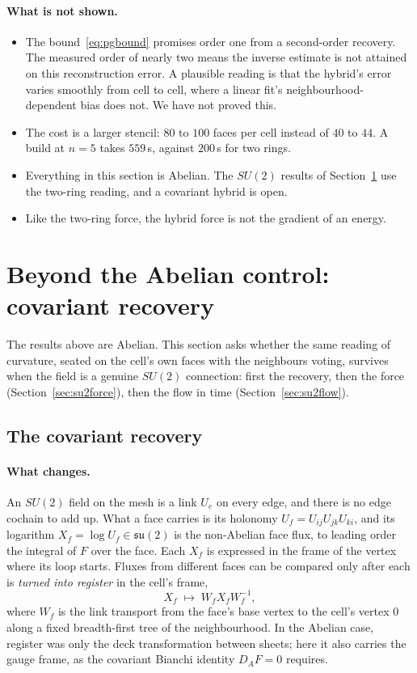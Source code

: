 \documentclass[11pt]{article}
\theoremstyle{definition}
\theoremstyle{remark}
\begin{document}
\paragraph{What is not shown.}
\begin{itemize}
  \item The bound~\eqref{eq:pgbound} promises order one from a second-order recovery. The
    measured order of nearly two means the inverse estimate is not attained on this
    reconstruction error. A plausible reading is that the hybrid's error varies smoothly from
    cell to cell, where a linear fit's neighbourhood-dependent bias does not. We have not
    proved this.
  \item The cost is a larger stencil: $80$ to $100$ faces per cell instead of $40$ to $44$.
    A build at $n=5$ takes $559$\,s, against $200$\,s for two rings.
  \item Everything in this section is Abelian. The $SU(2)$ results of
    Section~\ref{sec:su2} use the two-ring reading, and a covariant hybrid is open.
  \item Like the two-ring force, the hybrid force is not the gradient of an energy.
\end{itemize}

\section{Beyond the Abelian control: covariant recovery}\label{sec:su2}

The results above are Abelian. This section asks whether the same reading of curvature,
seated on the cell's own faces with the neighbours voting, survives when the field is a
genuine $SU(2)$ connection: first the recovery, then the force
(Section~\ref{sec:su2force}), then the flow in time (Section~\ref{sec:su2flow}).

\subsection{The covariant recovery}\label{sec:su2rec}

\paragraph{What changes.} An $SU(2)$ field on the mesh is a link $U_e$ on every edge, and
there is no edge cochain to add up. What a face carries is its holonomy
$U_f=U_{ij}U_{jk}U_{ki}$, and its logarithm $X_f=\log U_f\in\mathfrak{su}(2)$ is the
non-Abelian face flux, to leading order the integral of $F$ over the face. Each $X_f$ is
expressed in the frame of the vertex where its loop starts. Fluxes from different faces
can be compared only after each is \emph{turned into register} in the cell's frame,
\[
  X_f\;\mapsto\;W_fX_fW_f^{-1},
\]
where $W_f$ is the link transport from the face's base vertex to the cell's vertex $0$
along a fixed breadth-first tree of the neighbourhood. In the Abelian case, register was
only the deck transformation between sheets; here it also carries the gauge frame, as the
covariant Bianchi identity $D_AF=0$ requires.
\end{document}

